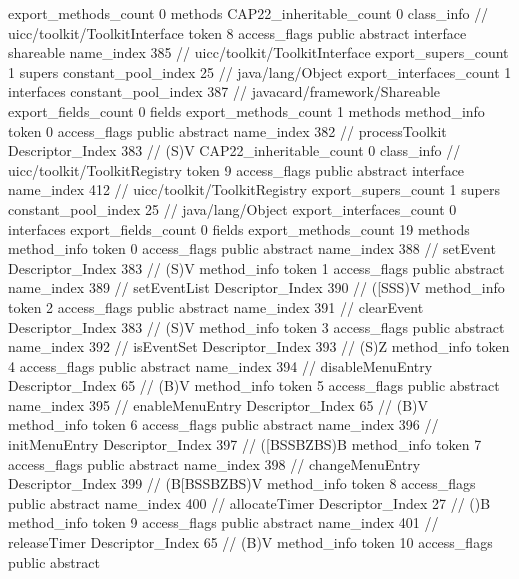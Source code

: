 {{{{{{{				}
				}
			}
			}
			export_methods_count	0
			methods {
			}
			CAP22_inheritable_count	0
		}
		class_info {		// uicc/toolkit/ToolkitInterface
			token	8
			access_flags	public abstract interface shareable
			name_index	385		// uicc/toolkit/ToolkitInterface
			export_supers_count	1
			supers {
				constant_pool_index	25		// java/lang/Object
			}
			export_interfaces_count	1
			interfaces {
				constant_pool_index	387		// javacard/framework/Shareable
			}
			export_fields_count	0
			fields {
			}
			export_methods_count	1
			methods {
				method_info {
					token	0
					access_flags	public abstract
					name_index	382		// processToolkit
					Descriptor_Index	383		// (S)V
				}
			}
			CAP22_inheritable_count	0
		}
		class_info {		// uicc/toolkit/ToolkitRegistry
			token	9
			access_flags	public abstract interface
			name_index	412		// uicc/toolkit/ToolkitRegistry
			export_supers_count	1
			supers {
				constant_pool_index	25		// java/lang/Object
			}
			export_interfaces_count	0
			interfaces {
			}
			export_fields_count	0
			fields {
			}
			export_methods_count	19
			methods {
				method_info {
					token	0
					access_flags	public abstract
					name_index	388		// setEvent
					Descriptor_Index	383		// (S)V
				}
				method_info {
					token	1
					access_flags	public abstract
					name_index	389		// setEventList
					Descriptor_Index	390		// ([SSS)V
				}
				method_info {
					token	2
					access_flags	public abstract
					name_index	391		// clearEvent
					Descriptor_Index	383		// (S)V
				}
				method_info {
					token	3
					access_flags	public abstract
					name_index	392		// isEventSet
					Descriptor_Index	393		// (S)Z
				}
				method_info {
					token	4
					access_flags	public abstract
					name_index	394		// disableMenuEntry
					Descriptor_Index	65		// (B)V
				}
				method_info {
					token	5
					access_flags	public abstract
					name_index	395		// enableMenuEntry
					Descriptor_Index	65		// (B)V
				}
				method_info {
					token	6
					access_flags	public abstract
					name_index	396		// initMenuEntry
					Descriptor_Index	397		// ([BSSBZBS)B
				}
				method_info {
					token	7
					access_flags	public abstract
					name_index	398		// changeMenuEntry
					Descriptor_Index	399		// (B[BSSBZBS)V
				}
				method_info {
					token	8
					access_flags	public abstract
					name_index	400		// allocateTimer
					Descriptor_Index	27		// ()B
				}
				method_info {
					token	9
					access_flags	public abstract
					name_index	401		// releaseTimer
					Descriptor_Index	65		// (B)V
				}
				method_info {
					token	10
					access_flags	public abstract
}}}}}
